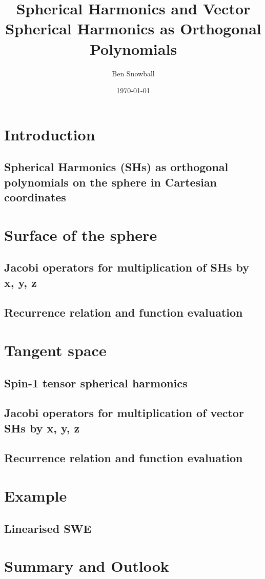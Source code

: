 \documentclass[10pt]{beamer}
\title{Spherical Harmonics and Vector Spherical Harmonics as Orthogonal Polynomials}
\author{Ben Snowball}
\date{\today}
\begin{document}
\frame{\titlepage}

\section[Outline]{}
\frame{\tableofcontents}
\section{Introduction}
\subsection{Spherical Harmonics (SHs) as orthogonal polynomials on the sphere in Cartesian coordinates}
\section{Surface of the sphere}
\subsection{Jacobi operators for multiplication of SHs by x, y, z}
\subsection{Recurrence relation and function evaluation}
\section{Tangent space}
\subsection{Spin-1 tensor spherical harmonics}
\subsection{Jacobi operators for multiplication of vector SHs by x, y, z}
\subsection{Recurrence relation and function evaluation}
\section{Example}
\subsection{Linearised SWE}
\section{Summary and Outlook}
\end{document}
